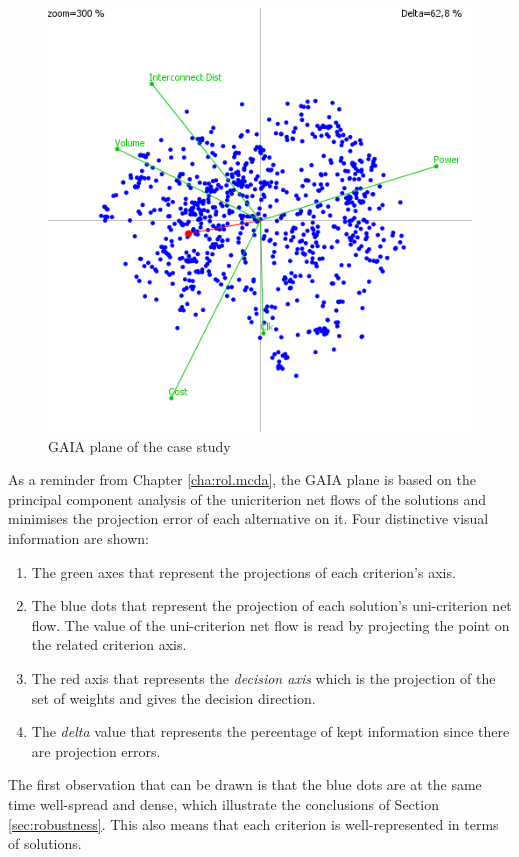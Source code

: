 \begin{figure}[h!]
\begin{center}
\includegraphics[width=0.8\linewidth]{gva804}
\end{center}
\caption{GAIA plane of the case study}
\label{fig:gva804}
\end{figure}

As a reminder from Chapter \ref{cha:rol.mcda}, the GAIA plane is based on the principal component analysis of the unicriterion net flows of the solutions and minimises the projection error of each alternative on it. Four distinctive visual information are shown:
\begin{enumerate}
\item The green axes that represent the projections of each criterion's axis.
\item The blue dots that represent the projection of each solution's uni-criterion net flow. The value of the uni-criterion net flow is read by projecting the point on the related criterion axis.
\item The red axis that represents the \textit{decision axis} which is the projection of the set of weights and gives the decision direction.
\item The \textit{delta} value that represents the percentage of kept information since there are projection errors.
\end{enumerate}

The first observation that can be drawn is that the blue dots are at the same time well-spread and dense, which illustrate the conclusions of Section \ref{sec:robustness}. This also means that each criterion is well-represented in terms of solutions.

